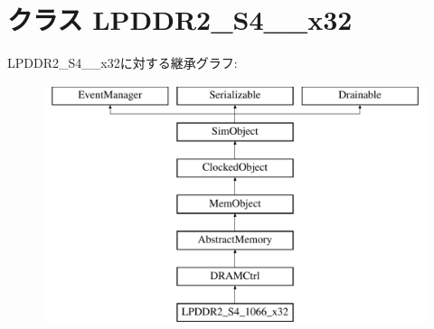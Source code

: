 \hypertarget{classDRAMCtrl_1_1LPDDR2__S4__1066__x32}{
\section{クラス LPDDR2\_\-S4\_\_\-x32}
\label{classDRAMCtrl_1_1LPDDR2__S4__1066__x32}
}
LPDDR2\_\-S4\_\_\-x32に対する継承グラフ:\begin{figure}[H]
\begin{center}
\leavevmode
\includegraphics[height=7cm]{classDRAMCtrl_1_1LPDDR2__S4__1066__x32}
\end{center}
\end{figure}
